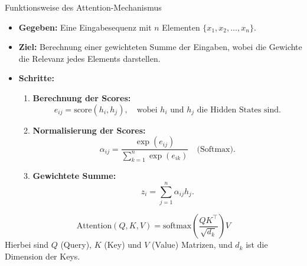 \documentclass[aspectratio=1610, xcolor=dvipsnames, 9pt]{beamer}
\begin{document}
\begin{frame}{Funktionsweise des Attention-Mechanismus}
  \begin{itemize}
    \item \textbf{Gegeben:} Eine Eingabesequenz mit \( n \) Elementen \( \{x_1, x_2, \dots, x_n\} \).
    \item \textbf{Ziel:} Berechnung einer gewichteten Summe der Eingaben, wobei die Gewichte die Relevanz jedes Elements darstellen.
    \item \textbf{Schritte:}
      \begin{enumerate}
        \item \textbf{Berechnung der Scores:}
        \[
        e_{ij} = \text{score}(h_i, h_j), \quad \text{wobei } h_i \text{ und } h_j \text{ die Hidden States sind.}
        \]
        \item \textbf{Normalisierung der Scores:}
        \[
        \alpha_{ij} = \frac{\exp(e_{ij})}{\sum_{k=1}^n \exp(e_{ik})} \quad \text{(Softmax)}.
        \]
        \item \textbf{Gewichtete Summe:}
        \[
        z_i = \sum_{j=1}^n \alpha_{ij} h_j.
        \]
      \end{enumerate}
  \end{itemize}
  \vspace{0.5cm}
  \begin{equation}
    \text{Attention}(Q, K, V) = \text{softmax}\left(\frac{QK^\top}{\sqrt{d_k}}\right)V
  \end{equation}
  Hierbei sind \( Q \) (Query), \( K \) (Key) und \( V \) (Value) Matrizen, und \( d_k \) ist die Dimension der Keys.
\end{frame}
\end{document}
